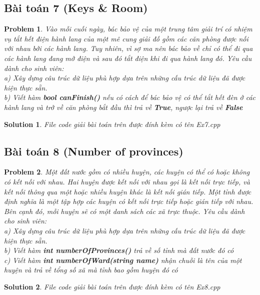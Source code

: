 \documentclass[a4paper]{article}
\newtheorem*{problem}{Problem}
\newtheorem*{sol}{Solution}
\begin{document}
    \subsection{Bài toán 7 (Keys & Room)}
\begin{problem}
Vào mỗi cuối ngày, bác bảo vệ của một trung tâm giải trí có nhiệm vụ tắt hết điện hành lang của một mê cung giải đố gồm các căn phòng được nối với nhau bởi các hành lang. Tuy nhiên, vì sợ ma nên bác bảo về chỉ có thể đi qua các hành lang đang mở điện và sau đó tắt điện khi đi qua hành lang đó. Yêu cầu dành cho sinh viên: \\
a) Xây dựng câu trúc dữ liệu phù hợp dựa trên những cấu trúc dữ liệu đã được hiện thực sẵn. \\
b) Viết hàm \textbf{bool canFinish()} nếu có cách để bác bảo vệ có thể tắt hết đèn ở các hành lang và trở về căn phòng bắt đầu thì trả về \textbf{True}, ngược lại trả về \textbf{False} \\
\end{problem}
    \begin{sol}
       File code giải bài toán trên được đính kèm có tên Ex7.cpp 
    \end{sol}
    \subsection{Bài toán 8 (Number of provinces)}
    \begin{problem}
Một đất nước gồm có nhiều huyện, các huyện có thể có hoặc không có kết nối với nhau. Hai huyện được kết nối với nhau gọi là kết nối trực tiếp, và kết nối thông qua một hoặc nhiều huyện khác là kết nối gián tiếp. Một tỉnh được định nghĩa là một tập hợp các huyện có kết nối trực tiếp hoặc gián tiếp với nhau. Bên cạnh đó, mỗi huyện sẽ có một danh sách các xã trực thuộc. Yêu cầu dành cho sinh viên: \\
a) Xây dựng câu trúc dữ liệu phù hợp dựa trên những cấu trúc dữ liệu đã được hiện thực sẵn. \\
b) Viết hàm \textbf{int numberOfProvinces()} trả về số tỉnh mà đất nước đó có \\
c) Viết hàm \textbf{int numberOfWard(string name)} nhận chuỗi là tên của một huyện và trả về tổng số xã mà tỉnh bao gồm huyện đó có\\

    \end{problem}
    \begin{sol}
        File code giải bài toán trên được đính kèm có tên Ex8.cpp
    \end{sol}
\end{document}

